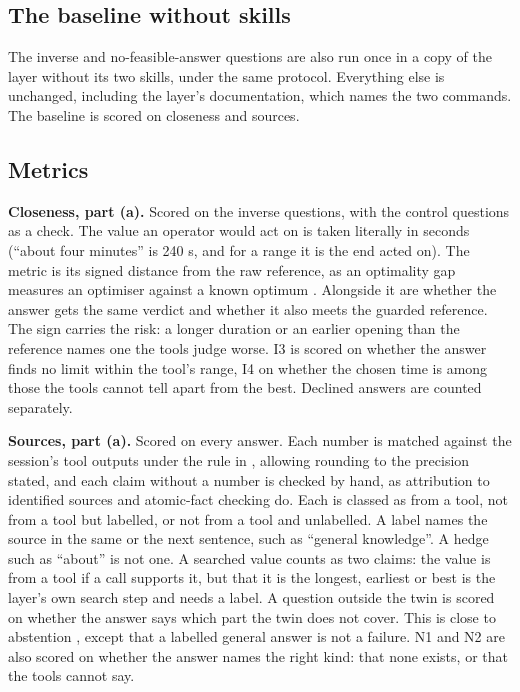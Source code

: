   \subsection{The baseline without skills}
  \label{sec:baseline}

  The inverse and no-feasible-answer questions are also run once in a copy of the layer without
  its two skills, under the same protocol. Everything else is unchanged, including the layer's
  documentation, which names the two commands. The baseline is scored on closeness and sources.

  \subsection{Metrics}
  \label{sec:metrics}

  \textbf{Closeness, part (a).} Scored on the inverse questions, with the control questions as a
  check. The value an operator would act on is taken literally in seconds (``about four
  minutes'' is 240 s, and for a range it is the end acted on). The metric is its signed distance from the
  raw reference, as an optimality gap measures an optimiser against a known optimum
  \cite{yang2024opro}. Alongside it are whether the answer gets the same verdict and whether it
  also meets the guarded reference. The sign carries the risk: a longer duration or an earlier opening than the reference
  names one the tools judge worse. I3 is scored on whether the answer finds no limit within the
  tool's range, I4 on whether the chosen time is among those the tools cannot tell apart from the
  best. Declined answers are counted separately.

  \textbf{Sources, part (a).} Scored on every answer. Each number is matched against the session's
  tool outputs under the rule in , allowing rounding to the precision stated, and
  each claim without a number is checked by hand, as attribution to identified sources
  \cite{rashkin2023ais} and atomic-fact checking \cite{min2023factscore} do. Each is classed as from a tool, not from a tool
  but labelled, or not from a tool and unlabelled. A label names the source in the same or the next
  sentence, such as ``general knowledge''. A hedge such as ``about'' is not one. A searched value
  counts as two claims: the value is from a tool if a call supports it, but that it is the longest,
  earliest or best is the layer's own search step and needs a label. A question outside the twin is
  scored on whether the answer says which part the twin does not cover. This is close to
  abstention \cite{wen2025abstention}, except that a labelled general answer is not a failure.
  N1 and N2 are also scored on whether the answer names the right kind: that none exists, or that
  the tools cannot say.


